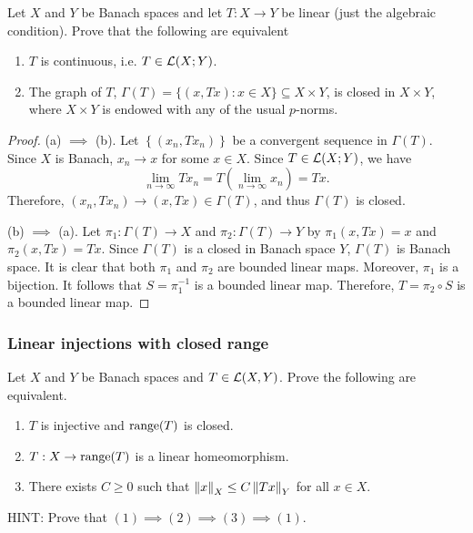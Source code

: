 \documentclass[a4paper]{article}
\begin{document}
\begin{thm}
    Let $X$ and $Y$ be Banach spaces and let $T : X \to Y$ be linear (just the algebraic condition).  Prove that the following are equivalent
\end{thm}
\begin{enumerate}
\item $T$ is continuous, i.e. $T \in \mathcal{L}(X;Y)$.
\item The graph of $T$, $\Gamma(T) = \{(x,Tx) : x \in X\} \subseteq X \times Y$, is closed in $X \times Y$, where $X \times Y$ is endowed with any of the usual $p$-norms.
\end{enumerate}

\begin{proof}
  (a) $\implies$ (b). Let $\left\{ (x_n, T x_n) \right\}$ be a convergent sequence 
  in $\Gamma(T)$. Since $X$ is Banach, $x_n \to x$ for some $x \in X$.
  Since $T \in \mathcal{L}(X ; Y)$, we have 
  \[
  \lim_{n \to \infty} T x_n = T \left( \lim_{n \to \infty} x_n \right) = T x.
  \]
  Therefore, $(x_n, T x_n) \to (x, T x) \in \Gamma(T)$, and thus 
  $\Gamma(T)$ is closed.

  (b) $\implies$ (a). Let $\pi_1 : \Gamma(T) \to X$ and 
  $\pi_2 : \Gamma(T) \to Y$ by 
  $\pi_1 (x, T x) = x$ and $\pi_2 (x, T x) = Tx$. Since 
  $\Gamma(T)$ is a closed in Banach space $Y$, 
  $\Gamma(T)$ is Banach space. It is clear that both $\pi_1$
  and $\pi_2$ are bounded linear maps. Moreover, $\pi_1$ is a 
  bijection. It follows that $S = \pi_1^{-1}$ is a bounded linear 
  map. Therefore, $T = \pi_2 \circ S$ is a bounded linear map. 
\end{proof}

\subsubsection*{Linear injections with closed range}
\begin{thm}
    Let $X$ and $Y$ be Banach spaces and $T \in \mathcal{L}(X,Y)$.  Prove the following are equivalent.
\begin{enumerate}
 \item $T$ is injective and $\operatorname{range}(T)$ is closed.
 \item $T : X \to \operatorname{range}(T)$ is a linear homeomorphism.
 \item There exists $C\ge 0$ such that $\left\lVert x\right\rVert_X \le C \left\lVert Tx\right\rVert_Y$ for all $x \in X$.
\end{enumerate}
HINT: Prove that $(1) \implies (2) \implies (3) \implies (1)$.
\end{thm}
\end{document}
